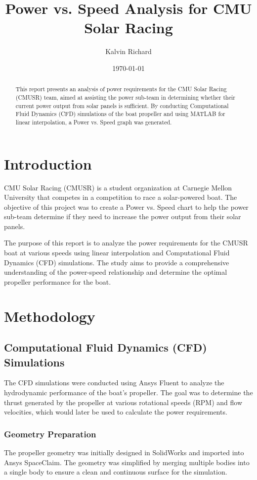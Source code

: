 \documentclass{article}
\title{Power vs. Speed Analysis for CMU Solar Racing}
\author{Kalvin Richard}
\date{\today}
\begin{document}
\maketitle

\begin{abstract}
This report presents an analysis of power requirements for the CMU Solar Racing (CMUSR) team, aimed at assisting the power sub-team in determining whether their current power output from solar panels is sufficient. By conducting Computational Fluid Dynamics (CFD) simulations of the boat propeller and using MATLAB for linear interpolation, a Power vs. Speed graph was generated.
\end{abstract}

\section{Introduction}
CMU Solar Racing (CMUSR) is a student organization at Carnegie Mellon University that competes in a competition to race a solar-powered boat. The objective of this project was to create a Power vs. Speed chart to help the power sub-team determine if they need to increase the power output from their solar panels.

The purpose of this report is to analyze the power requirements for the CMUSR boat at various speeds using linear interpolation and Computational Fluid Dynamics (CFD) simulations. The study aims to provide a comprehensive understanding of the power-speed relationship and determine the optimal propeller performance for the boat.

\section{Methodology}
\subsection{Computational Fluid Dynamics (CFD) Simulations}
The CFD simulations were conducted using Ansys Fluent to analyze the hydrodynamic performance of the boat's propeller. The goal was to determine the thrust generated by the propeller at various rotational speeds (RPM) and flow velocities, which would later be used to calculate the power requirements.

\subsubsection{Geometry Preparation}
The propeller geometry was initially designed in SolidWorks and imported into Ansys SpaceClaim. The geometry was simplified by merging multiple bodies into a single body to ensure a clean and continuous surface for the simulation.
\end{document}
